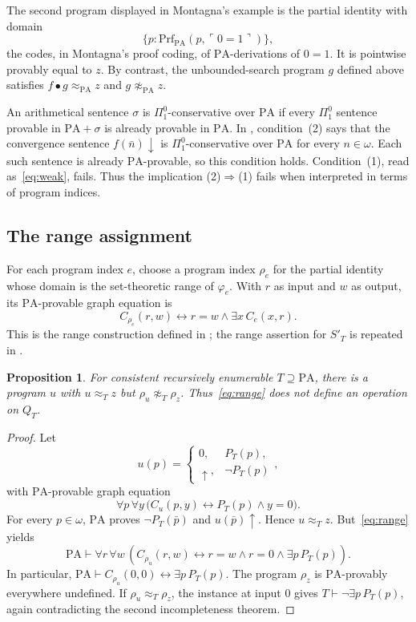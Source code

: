 \documentclass[11pt]{article}
\newtheorem{proposition}[theorem]{Proposition}
\newcommand{\PA}{\mathrm{PA}}
\begin{document}
The second program displayed in Montagna's example is the partial identity
with domain
\[
 \{p:\mathrm{Prf}_{\PA}(p,\ulcorner0=1\urcorner)\},
\]
the codes, in Montagna's proof coding, of $\PA$-derivations of $0=1$. It is
pointwise provably equal to $z$. By contrast, the unbounded-search program
$g$ defined above satisfies $f\bullet g\approx_{\PA}z$ and
$g\not\approx_{\PA}z$.

An arithmetical sentence $\sigma$ is $\Pi^0_1$-conservative over
$\PA$ if every $\Pi^0_1$ sentence provable in $\PA+\sigma$ is
already provable in $\PA$.
In \cite[Theorem~2.3, p.~111]{Montagna}, condition~(2) says that
the convergence sentence $f(\bar n)\downarrow$ is
$\Pi^0_1$-conservative over $\PA$ for every $n\in\omega$.
Each such sentence is already $\PA$-provable, so this condition holds.
Condition~(1), read as~\eqref{eq:weak}, fails.
Thus the implication (2)$\Rightarrow$(1) fails when interpreted in
terms of program indices.

\subsection{The range assignment}

For each program index $e$, choose a program index $\rho_e$ for the partial
identity whose domain is the set-theoretic range of $\varphi_e$. With $r$ as
input and $w$ as output, its $\PA$-provable graph equation is
\begin{equation}\label{eq:range}
 C_{\rho_e}(r,w)\longleftrightarrow
 r=w\land\exists x\,C_e(x,r).
\end{equation}
This is the range construction defined in
\cite[p.~111]{Montagna}; the range assertion for $S'_T$ is repeated in
\cite[p.~646]{DiPaolaMontagna}.

\begin{proposition}\label{prop:range}
For consistent recursively enumerable $T\supseteq\PA$, there is a program
$u$ with $u\approx_Tz$ but $\rho_u\not\approx_T\rho_z$.
Thus~\eqref{eq:range} does not define an operation on $Q_T$.
\end{proposition}

\begin{proof}
Let
\[
 u(p)=
 \begin{cases}
 0,&P_T(p),\\
 \uparrow,&\neg P_T(p)
 \end{cases},
\]
with $\PA$-provable graph equation
\[
 \forall p\,\forall y\,
 \bigl(C_u(p,y)\longleftrightarrow P_T(p)\land y=0\bigr).
\]
For every $p\in\omega$, $\PA$ proves $\neg P_T(\bar p)$ and
$u(\bar p)\uparrow$. Hence $u\approx_Tz$.
But~\eqref{eq:range} yields
\[
 \PA\vdash\forall r\,\forall w\,
 \left(C_{\rho_u}(r,w)\longleftrightarrow
       r=w\land r=0\land\exists p\,P_T(p)\right).
\]
In particular,
$\PA\vdash C_{\rho_u}(0,0)\leftrightarrow\exists p\,P_T(p)$.
The program $\rho_z$ is $\PA$-provably everywhere undefined.
If $\rho_u\approx_T\rho_z$, the instance at input $0$ gives
$T\vdash\neg\exists p\,P_T(p)$, again contradicting the second
incompleteness theorem.
\end{proof}
\end{document}
